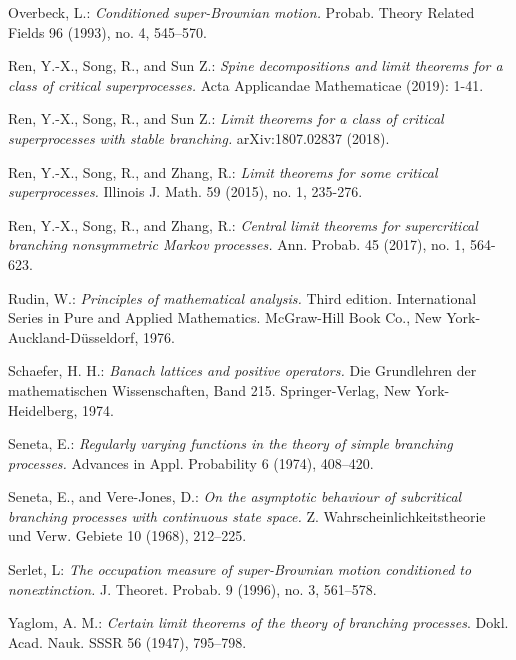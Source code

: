 \documentclass[12pt,a4paper]{amsart}
\numberwithin{equation}{section}
\theoremstyle{plain}
\theoremstyle{definition}
\theoremstyle{remark}
\begin{document}
\begin{thebibliography}{99}
	Overbeck, L.:
	\emph{Conditioned super-Brownian motion.} 
	Probab. Theory Related Fields 96 (1993), no. 4, 545–570.
	
	Ren, Y.-X., Song, R., and Sun Z.: 
	\emph{Spine decompositions and limit theorems for a class of critical superprocesses.} 
	Acta Applicandae Mathematicae (2019): 1-41.
	
	Ren, Y.-X., Song, R., and Sun Z.: 
	\emph{Limit theorems for a class of critical superprocesses with stable branching.} 
	arXiv:1807.02837 (2018).
	

	Ren, Y.-X., Song, R., and Zhang, R.:
	\emph{Limit theorems for some critical superprocesses.}
	Illinois J. Math. 59 (2015), no. 1, 235-276.

	Ren, Y.-X., Song, R., and Zhang, R.:
	\emph{Central limit theorems for supercritical branching nonsymmetric Markov processes.}
	Ann. Probab. 45 (2017), no. 1, 564-623.
	
	Rudin, W.:
	\emph{Principles of mathematical analysis.}
	Third edition. International Series in Pure and Applied Mathematics. McGraw-Hill Book Co., New York-Auckland-Düsseldorf, 1976.

	Schaefer, H. H.:
	\emph{Banach lattices and positive operators.}
	Die Grundlehren der mathematischen Wissenschaften, Band 215. Springer-Verlag, New York-Heidelberg, 1974.
	
	Seneta, E.:
	\emph{Regularly varying functions in the theory of simple branching processes.}
	Advances in Appl. Probability 6 (1974), 408–420.
	
	Seneta, E., and Vere-Jones, D.:
	\emph{On the asymptotic behaviour of subcritical branching processes with continuous state space.}
	Z. Wahrscheinlichkeitstheorie und Verw. Gebiete 10 (1968), 212–225.
	
	Serlet, L:
	\emph{The occupation measure of super-Brownian motion conditioned to nonextinction.} 
	J. Theoret. Probab. 9 (1996), no. 3, 561–578.

	Yaglom, A. M.: \emph{Certain limit theorems of the theory of branching processes}. Dokl. Acad.
	Nauk. SSSR 56 (1947), 795--798.

\end{thebibliography}
\end{document}
